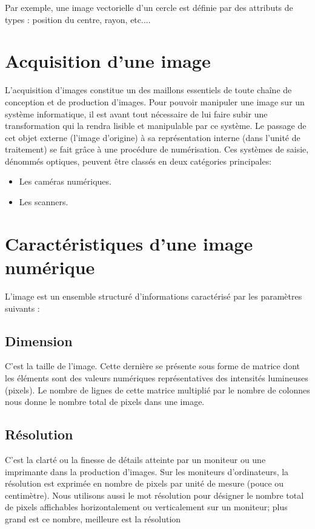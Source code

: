\documentclass[11pt]{report}
\begin{document}
Par exemple, une image vectorielle d’un cercle est définie par des attributs de types :
position du centre, rayon, etc....

\section{Acquisition d'une image}

L’acquisition d’images constitue un des maillons essentiels de toute chaîne de
conception et de production d’images. Pour pouvoir manipuler une image sur un système
informatique, il est avant tout nécessaire de lui faire subir une transformation qui la rendra
lisible et manipulable par ce système. Le passage de cet objet externe (l’image d’origine) à sa
représentation interne (dans l’unité de traitement) se fait grâce à une procédure de
numérisation. Ces systèmes de saisie, dénommés optiques, peuvent être classés en deux
catégories principales:

\begin{itemize}
\item  Les caméras numériques.
\item  Les scanners.
\end{itemize}
\section{Caractéristiques d’une image numérique}

L’image est un ensemble structuré d’informations caractérisé par les paramètres
suivants :
\subsection{Dimension}
C’est la taille de l’image. Cette dernière se présente sous forme de matrice dont les
éléments sont des valeurs numériques représentatives des intensités lumineuses (pixels). Le
nombre de lignes de cette matrice multiplié par le nombre de colonnes nous donne le
nombre total de pixels dans une image.
\subsection{Résolution}

C’est la clarté ou la finesse de détails atteinte par un moniteur ou une imprimante
dans la production d’images. Sur les moniteurs d’ordinateurs, la résolution est exprimée en
nombre de pixels par unité de mesure (pouce ou centimètre). Nous utilisons aussi le mot
résolution pour désigner le nombre total de pixels affichables horizontalement ou
verticalement sur un moniteur; plus grand est ce nombre, meilleure est la résolution
\end{document}
